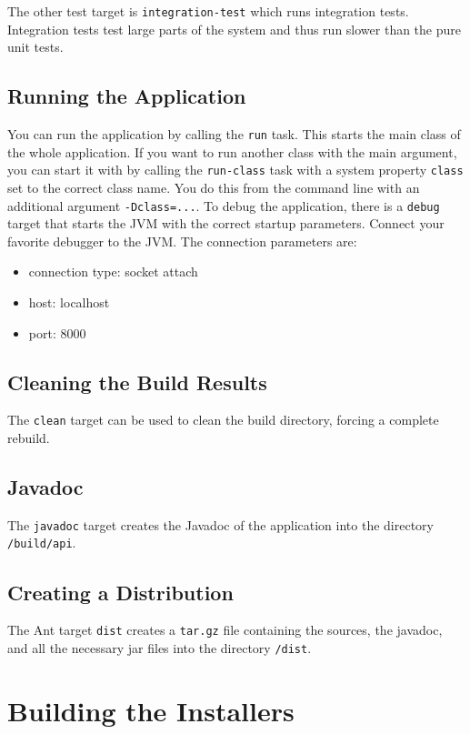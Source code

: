 \documentclass[11pt,a4paper]{article}
\begin{document}
The other test target is \texttt{integration-test} which runs integration tests.
Integration tests test large parts of the system and thus run slower than
the pure unit tests.

\subsection{Running the Application}
You can run the application by calling the \texttt{run} task. This starts
the main class of the whole application. If you want to run another class
with the main argument, you can start it with by calling the \texttt{run-class}
task with a system property \texttt{class} set to the correct class name.
You do this from the command line with an additional argument 
\texttt{-Dclass=...}. To debug the application, there is a \texttt{debug}
target that starts the JVM with the correct startup parameters. Connect
your favorite debugger to the JVM. The connection parameters are:
\begin{itemize}
 \item connection type: socket attach
 \item host: localhost
 \item port: 8000
\end{itemize}

\subsection{Cleaning the Build Results}
The \texttt{clean} target can be used to clean the build directory,
forcing a complete rebuild.

\subsection{Javadoc}
The \texttt{javadoc} target creates the Javadoc of the application into the
directory \texttt{/build/api}.

\subsection{Creating a Distribution}
The Ant target \texttt{dist} creates a \texttt{tar.gz} file containing the
sources, the javadoc, and all the necessary jar files into the directory
\texttt{/dist}.


\section{Building the Installers}
\end{document}
